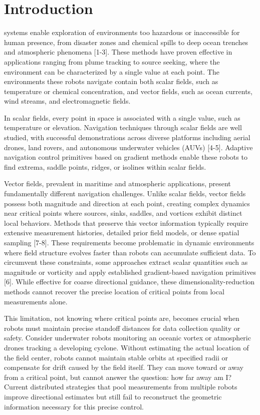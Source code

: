 \documentclass[lettersize,journal]{IEEEtran}
\begin{document}
\section{Introduction}
 systems enable exploration of environments too hazardous or inaccessible for human presence, from disaster zones and chemical spills to deep ocean trenches and atmospheric phenomena [1-3]. These methods have proven effective in applications ranging from plume tracking to source seeking, where the environment can be characterized by a single value at each point. The environments these robots navigate contain both scalar fields, such as temperature or chemical concentration, and vector fields, such as ocean currents, wind streams, and electromagnetic fields.

In scalar fields, every point in space is associated with a single value, such as temperature or elevation. Navigation techniques through scalar fields are well studied, with successful demonstrations across diverse platforms including aerial drones, land rovers, and autonomous underwater vehicles (AUVs) [4-5]. Adaptive navigation control primitives based on gradient methods enable these robots to find extrema, saddle points, ridges, or isolines within scalar fields. 

Vector fields, prevalent in maritime and atmospheric applications, present fundamentally different navigation challenges. Unlike scalar fields, vector fields possess both magnitude and direction at each point, creating complex dynamics near critical points where sources, sinks, saddles, and vortices exhibit distinct local behaviors. Methods that preserve this vector information typically require extensive measurement histories, detailed prior field models, or dense spatial sampling [7-8]. These requirements become problematic in dynamic environments where field structure evolves faster than robots can accumulate sufficient data. To circumvent these constraints, some approaches extract scalar quantities such as magnitude or vorticity and apply established gradient-based navigation primitives [6]. While effective for coarse directional guidance, these dimensionality-reduction methods cannot recover the precise location of critical points from local measurements alone.

This limitation, not knowing where critical points are, becomes crucial when robots must maintain precise standoff distances for data collection quality or safety. Consider underwater robots monitoring an oceanic vortex or atmospheric drones tracking a developing cyclone. Without estimating the actual location of the field center, robots cannot maintain stable orbits at specified radii or compensate for drift caused by the field itself. They can move toward or away from a critical point, but cannot answer the question: how far away am I? Current distributed strategies that pool measurements from multiple robots improve directional estimates but still fail to reconstruct the geometric information necessary for this precise control.
\end{document}
